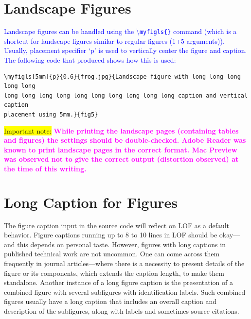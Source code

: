\documentclass[phd]{ndsu-thesis-2022}
\newcommand\italk[1]{\textcolor{blue}{#1}}  %
\newcommand\cmd[1]{\textbackslash\texttt{#1}}  %
\begin{document}
\section{Landscape Figures}

\italk{Landscape figures can be handled using the \cmd{myfigls\{\}} command (which is a shortcut for landscape figures similar to regular figures (1+5 arguments)). Usually, placement specifier `p' is used to vertically center the figure and caption. The following code that produced \Cref{fig5} shows how this is used:}

\vspace{-4ex}
{\singlespace
\begin{verbatim}
\myfigls[5mm]{p}{0.6}{frog.jpg}{Landscape figure with long long long long long
long long long long long long long long long long caption and vertical caption
placement using 5mm.}{fig5}
\end{verbatim}
}

\italk{\hl{Important note:}} \textcolor{magenta}{\bfseries While printing the landscape pages (containing tables and figures) the settings should be double-checked. Adobe Reader was known to print landscape pages in the correct format. Mac Preview was observed not to give the correct output (distortion observed) at the time of this writing.}

\kant[4]



\section{Long Caption for Figures}

The figure caption input in the source code will reflect on LOF as a default behavior. Figure captions running up to 8 to 10 lines in LOF should be okay---and this depends on personal taste. However, figures with long captions in published technical work are not uncommon. One can come across them frequently in journal articles---where there is a necessity to present details of the figure or its components, which extends the caption length, to make them standalone. Another instance of a long figure caption is the presentation of a combined figure with several subfigures with identification labels. Such combined figures usually have a long caption that includes an overall caption and description of the subfigures, along with labels and sometimes source citations.
\end{document}
